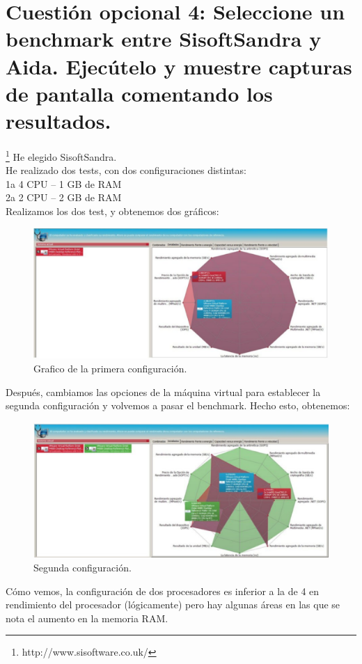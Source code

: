 \section*{Cuestión opcional 4: Seleccione un benchmark entre SisoftSandra y Aida. Ejecútelo y muestre capturas de pantalla comentando los resultados.}
\footnote{http://www.sisoftware.co.uk/}
He elegido SisoftSandra.
\\
He realizado dos tests, con dos configuraciones distintas: 
\\
1a 4 CPU – 1 GB de RAM 
\\
2a 2 CPU – 2 GB de RAM 
\\
Realizamos los dos test, y obtenemos dos gráficos:
\begin{figure}[H]
\begin{center}
\includegraphics[scale=0.4]{imagenes/opcional4-1.eps}
\caption{Grafico de la primera configuración.}
\end{center}
\end{figure}
Después, cambiamos las opciones de la máquina virtual para establecer la segunda configuración y volvemos a pasar el benchmark. Hecho esto, obtenemos:
\begin{figure}[H]
\begin{center}
\includegraphics[scale=0.4]{imagenes/opcional4-2.eps}
\caption{Segunda configuración.}
\end{center}
\end{figure}

Cómo vemos, la configuración de dos procesadores es inferior a la de 4 en 
rendimiento del procesador (lógicamente) pero hay algunas áreas en las que se nota 
el aumento en la memoria RAM. 
